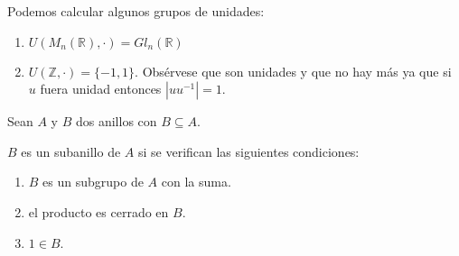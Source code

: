 \begin{example}
Podemos calcular algunos grupos de unidades:

\begin{enumerate}
\item $U(M_n(\mathbb{R}),\cdot) = Gl_n(\mathbb{R})$
\item $U(\mathbb{Z},\cdot) = \{-1,1\}$. Obsérvese que son unidades y que no hay más ya que si $u$ fuera unidad entonces $|uu^{-1}| = 1$.
\end{enumerate}
\end{example}

\begin{definition}[Subanillo]
Sean $A$ y $B$ dos anillos con $B \subseteq A$. 

$B$ es un subanillo de $A$ si se verifican las siguientes condiciones:

\begin{enumerate}
	\item $B$ es un subgrupo de $A$ con la suma. 
	\item el producto es cerrado en $B$.
	\item $1 \in B$. 
\end{enumerate} 
\end{definition}

